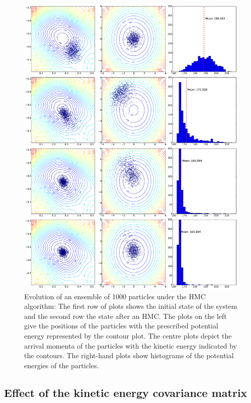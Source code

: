 \begin{figure}[t]
\centering
\includegraphics[width=2.05\columnwidth]{figures/hmcvi_distrib_example_top.pdf}
\caption{Evolution of an ensemble of 1000 particles under the HMC algorithm: The first row of plots shows the initial state of the system and the second row the state after an HMC. The plots on the left give the positions of the particles with the prescribed potential energy represented by the contour plot. The centre plots depict the arrival momenta of the particles with the kinetic energy indicated by the contours. The right-hand plots show histograms of the potential energies of the particles.}
\label{fig:HMC_Effect_Illustration}
\end{figure}

\subsection{Effect of the kinetic energy covariance matrix}
\label{sec:EffectOfKineticEnergyChoice}

